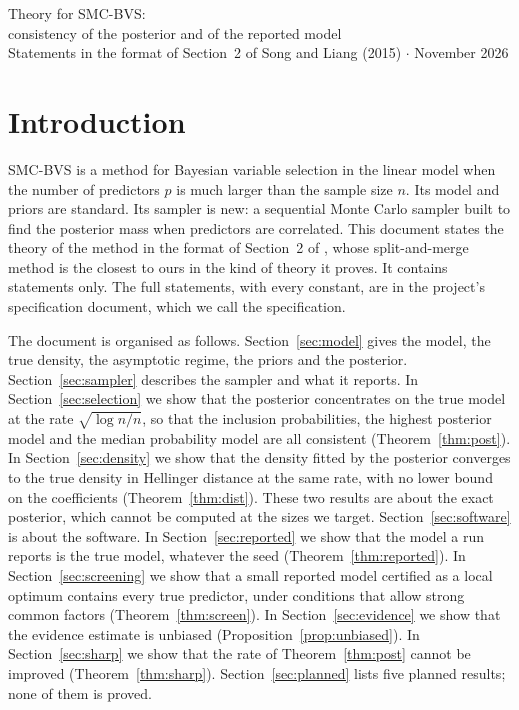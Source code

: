 \documentclass[11pt]{article}
\newcommand{\rn}{\sqrt{\log n/n}}
\theoremstyle{plain}
\theoremstyle{definition}
\begin{document}
\begin{center}
{\LARGE Theory for SMC-BVS:\\[3pt] consistency of the posterior and of the reported model}\\[8pt]
{\large Statements in the format of Section~2 of Song and Liang (2015) \quad$\cdot$ November 2026}
\end{center}
\medskip

\section{Introduction}\label{sec:intro}

SMC-BVS is a method for Bayesian variable selection in the linear model when the number of predictors $p$ is much
larger than the sample size $n$. Its model and priors are standard. Its sampler is new: a sequential Monte Carlo
sampler built to find the posterior mass when predictors are correlated. This document states the theory of the method
in the format of Section~2 of \citet{SongLiang2015}, whose split-and-merge method is the closest to ours in the kind of
theory it proves. It contains statements only. The full statements, with every constant, are in the project's
specification document, which we call the specification.

The document is organised as follows. Section~\ref{sec:model} gives the model, the true density, the asymptotic regime,
the priors and the posterior. Section~\ref{sec:sampler} describes the sampler and what it reports. In
Section~\ref{sec:selection} we show that the posterior concentrates on the true model at the rate $\rn$, so that the
inclusion probabilities, the highest posterior model and the median probability model are all consistent
(Theorem~\ref{thm:post}). In Section~\ref{sec:density} we show that the density fitted by the posterior converges to the
true density in Hellinger distance at the same rate, with no lower bound on the coefficients (Theorem~\ref{thm:dist}).
These two results are about the exact posterior, which cannot be computed at the sizes we target. Section~\ref{sec:software}
is about the software. In Section~\ref{sec:reported} we show that the model a run reports is the true model, whatever
the seed (Theorem~\ref{thm:reported}). In Section~\ref{sec:screening} we show that a small reported model certified as a
local optimum contains every true predictor, under conditions that allow strong common factors
(Theorem~\ref{thm:screen}). In Section~\ref{sec:evidence} we show that the evidence estimate is unbiased
(Proposition~\ref{prop:unbiased}). In Section~\ref{sec:sharp} we show that the rate of Theorem~\ref{thm:post} cannot be
improved (Theorem~\ref{thm:sharp}). Section~\ref{sec:planned} lists five planned results; none of them is proved.
\end{document}
